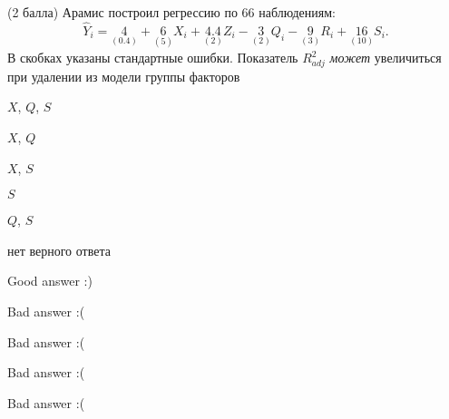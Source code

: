 
\begin{question}
(2 балла) Арамис построил регрессию по 66 наблюдениям: \[
\hat Y_i = \underset{(0.4)}{4} + \underset{(5)}{6}X_i + \underset{(2)}{4.4} Z_i - \underset{(2)}{3} Q_i - \underset{(3)}{9} R_i + \underset{(10)}{16} S_i.
\]
В скобках указаны стандартные ошибки.
Показатель \(R^2_{adj}\) \emph{может} увеличиться при удалении из
модели группы факторов
\begin{answerlist}
  \item \(X\), \(Q\), \(S\)
  \item \(X\), \(Q\)
  \item \(X\), \(S\)
  \item \(S\)
  \item \(Q\), \(S\)
  \item нет верного ответа
\end{answerlist}
\end{question}

\begin{solution}
\begin{answerlist}
  \item Good answer :)
  \item Bad answer :(
  \item Bad answer :(
  \item Bad answer :(
  \item Bad answer :(
\end{answerlist}
\end{solution}
